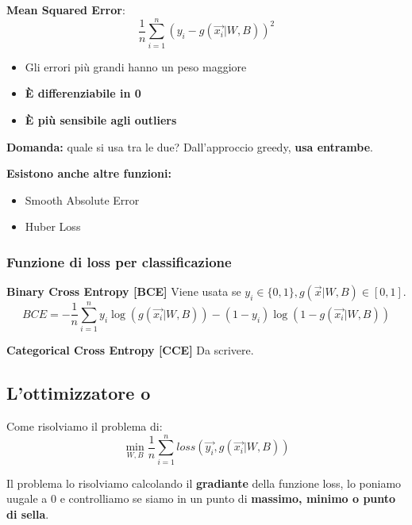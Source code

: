 \textbf{Mean Squared Error}:
\begin{equation}
    \frac{1}{n} \sum_{i=1}^n (y_i - g(\vec{x_i}|W,B))^2
\end{equation}

\begin{itemize}
    \item Gli errori più grandi hanno un peso maggiore
    \item \textbf{È differenziabile in 0}
    \item \textbf{È più sensibile agli outliers}
\end{itemize}

\textbf{Domanda:} quale si usa tra le due? Dall'approccio greedy, \textbf{usa entrambe}.

\textbf{Esistono anche altre funzioni:}
\begin{itemize}
    \item Smooth Absolute Error
    \item Huber Loss
\end{itemize}

\subsubsection{Funzione di loss per classificazione}

\textbf{Binary Cross Entropy [BCE]}
Viene usata se $y_i \in \{0,1\}, g(\vec{x}|W,B) \in [0,1]$.
\begin{equation}
    BCE = -\frac{1}{n} \sum_{i=1}^n y_i \log(g(\vec{x_i}|W,B)) - (1-y_i)\log(1-g(\vec{x_i}|W,B))
\end{equation}

\textbf{Categorical Cross Entropy [CCE]}
Da scrivere.

\subsection{L'ottimizzatore o}
Come risolviamo il problema di:
\begin{equation}
    \min_{W,B} \frac{1}{n} \sum_{i=1}^n loss(\vec{y_i}, g(\vec{x_i}|W,B))
\end{equation}

Il problema lo risolviamo calcolando il \textbf{gradiante} della funzione loss,
lo poniamo uugale a 0 e controlliamo se siamo in un punto di \textbf{massimo,
    minimo o punto di sella}.


